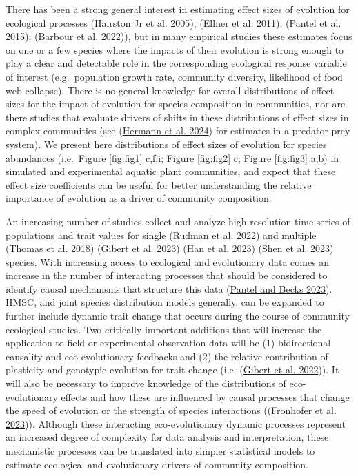 \documentclass[
]{article}
\begin{document}
There has been a strong general interest in estimating effect sizes of evolution for ecological processes (\protect\hyperlink{ref-Hairston2005}{Hairston Jr et al. 2005}); (\protect\hyperlink{ref-Ellner2011}{Ellner et al. 2011}); (\protect\hyperlink{ref-Pantel2015}{Pantel et al. 2015}); (\protect\hyperlink{ref-Barbour2022}{Barbour et al. 2022})), but in many empirical studies these estimates focus on one or a few species where the impacts of their evolution is strong enough to play a clear and detectable role in the corresponding ecological response variable of interest (e.g.~population growth rate, community diversity, likelihood of food web collapse). There is no general knowledge for overall distributions of effect sizes for the impact of evolution for species composition in communities, nor are there studies that evaluate drivers of shifts in these distributions of effect sizes in complex communities (see (\protect\hyperlink{ref-Hermann2024}{Hermann et al. 2024}) for estimates in a predator-prey system). We present here distributions of effect sizes of evolution for species abundances (i.e.~Figure \ref{fig:fig1} c,f,i; Figure \ref{fig:fig2} c; Figure \ref{fig:fig3} a,b) in simulated and experimental aquatic plant communities, and expect that these effect size coefficients can be useful for better understanding the relative importance of evolution as a driver of community composition.

An increasing number of studies collect and analyze high-resolution time series of populations and trait values for single (\protect\hyperlink{ref-Rudman2022}{Rudman et al. 2022}) and multiple (\protect\hyperlink{ref-Thomas2018}{Thomas et al. 2018}) (\protect\hyperlink{ref-Gibert2023}{Gibert et al. 2023}) (\protect\hyperlink{ref-Han2023}{Han et al. 2023}) (\protect\hyperlink{ref-Shen2023}{Shen et al. 2023}) species. With increasing access to ecological and evolutionary data comes an increase in the number of interacting processes that should be considered to identify causal mechanisms that structure this data (\protect\hyperlink{ref-Pantel2023}{Pantel and Becks 2023}). HMSC, and joint species distribution models generally, can be expanded to further include dynamic trait change that occurs during the course of community ecological studies. Two critically important additions that will increase the application to field or experimental observation data will be (1) bidirectional causality and eco-evolutionary feedbacks and (2) the relative contribution of plasticity and genotypic evolution for trait change (i.e. (\protect\hyperlink{ref-Gibert2022}{Gibert et al. 2022})). It will also be necessary to improve knowledge of the distributions of eco-evolutionary effects and how these are influenced by causal processes that change the speed of evolution or the strength of species interactions ((\protect\hyperlink{ref-Fronhofer2023}{Fronhofer et al. 2023})). Although these interacting eco-evolutionary dynamic processes represent an increased degree of complexity for data analysis and interpretation, these mechanistic processes can be translated into simpler statistical models to estimate ecological and evolutionary drivers of community composition.
\end{document}
